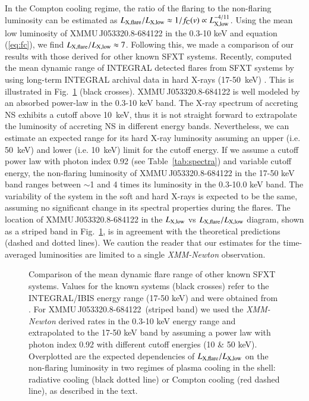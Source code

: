\documentclass[a4paper,fleqn,usenatbib]{mnras}
\newcommand{\xmm}{{\it XMM-Newton}\xspace}
\newcommand{\candb}{XMMU\,J053320.8-684122\xspace} %
\begin{document}
In the Compton cooling regime, the ratio of the flaring  to the non-flaring luminosity can be estimated as $L_{\rm X, flare}/L_{\rm X, low} \approx 1/f_{\rm C}(v)\propto L_{\rm X, low}^{-4/11}$.  Using the mean low luminosity of \candb in the 0.3-10 keV and equation (\ref{eq:fc}), we find  $L_{\rm X, flare}/L_{\rm X, low} \approx 7$. 
Following this, we made a comparison of our results with those derived for other known SFXT systems. 
Recently, \cite{2014MNRAS.442.2325S} computed the mean dynamic range of INTEGRAL detected flares from SFXT systems by using long-term INTEGRAL archival data in hard X-rays (17-50~keV) \citep{2014MNRAS.439.3439P}. This is illustrated in Fig.~\ref{fig:sfxr_flare} (black crosses).
\candb is well modeled by an absorbed power-law in the 0.3-10 keV band.
The X-ray spectrum of accreting NS exhibits a cutoff above 10~keV, thus it is not straight forward to extrapolate the luminosity of accreting NS in different energy bands. Nevertheless, we can estimate an expected range for its hard X-ray luminosity assuming an upper (i.e. 50~keV) and lower (i.e. 10~keV) limit for the cutoff energy.
If we assume a cutoff power law with photon index 0.92 (see Table~\ref{tab:spectra}) and variable cutoff energy,
the non-flaring luminosity of \candb in the 17-50 keV band ranges between $\sim$1 and 4 times its luminosity in the 0.3-10.0 keV band.
The variability of the system in the soft and hard X-rays is expected to be the same, assuming no significant change in its spectral properties during the flares.
The location of \candb in the $L_{\rm X,low}$ vs $L_{\rm X,flare}/L_{\rm X,low}$ diagram, shown as a striped band in Fig.~\ref{fig:sfxr_flare}, is in agreement with the theoretical predictions (dashed and dotted lines). We caution the reader that our estimates for the time-averaged luminosities are limited to a single \xmm observation.

\begin{figure}
  \caption{Comparison of the mean dynamic flare range of other known SFXT systems. Values for the known systems (black crosses) refer to the INTEGRAL/IBIS energy range (17-50 keV) and were obtained from \citet{2014MNRAS.439.3439P}. For \candb~(striped band) we used the \xmm derived rates in the 0.3-10 keV energy range and extrapolated to the 17-50 keV band by assuming a power law with photon index 0.92 with different cutoff energies (10 \& 50 keV).  Overplotted are the expected dependencies of $L_{\rm X, flare}/L_{\rm X,low}$ on the non-flaring luminosity in two regimes of plasma cooling in the shell: radiative cooling (black dotted line)  \citep[see][]{2014MNRAS.442.2325S} or Compton cooling (red dashed line), as described in the text.}
  \label{fig:sfxr_flare}
\end{figure}
 
\end{document}
